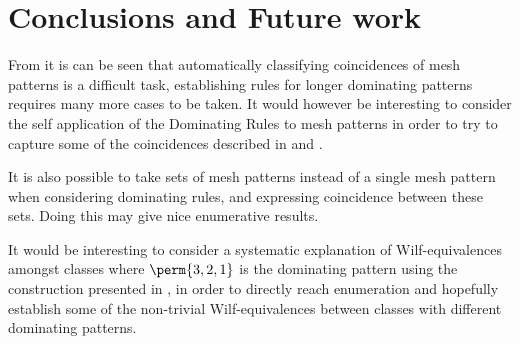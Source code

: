 \chapter{Conclusions and Future work}
From  it is can be seen that automatically classifying
coincidences of mesh patterns is a difficult task, establishing rules for longer
dominating patterns requires many more cases to be taken. It would however
be interesting to consider the self application of the Dominating Rules to mesh
patterns in order to try to capture some of the coincidences described in
\textcite{DBLP:journals/combinatorics/HilmarssonJSVU15} and \textcite{journals/combinatorics/BrandenC11}.

It is also possible to take sets of mesh patterns instead of a single mesh pattern
when considering dominating rules, and expressing coincidence between these sets.
Doing this may give nice enumerative results.

It would be interesting to consider a systematic explanation of Wilf-equivalences
amongst classes where \(\perm{3,2,1}\) is the dominating pattern using the
construction presented in \cite[Sec.~12]{2015arXiv151203226B}, in order to directly
reach enumeration and hopefully establish some of the non-trivial Wilf-equivalences
between classes with different dominating patterns.
